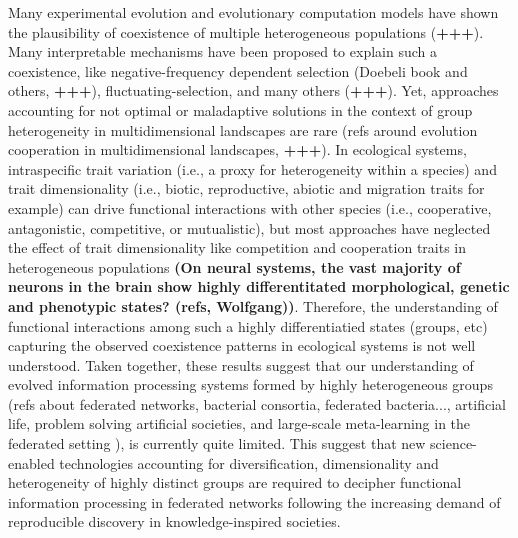 \documentclass[11pt, a4paper]{article} %
\begin{document}
Many experimental evolution and evolutionary computation models have
shown the plausibility of coexistence of multiple heterogeneous
populations ({\bf +++}). Many interpretable mechanisms have been
proposed to explain such a coexistence, like negative-frequency
dependent selection (Doebeli book and others, {\bf +++}),
fluctuating-selection, and many others ({\bf +++}). Yet, approaches
accounting for not optimal or maladaptive solutions in the context of
group heterogeneity in multidimensional landscapes are rare (refs
around evolution cooperation in multidimensional landscapes, {\bf
  +++}). In ecological systems, intraspecific trait variation (i.e., a
proxy for heterogeneity within a species) and trait dimensionality
(i.e., biotic, reproductive, abiotic and migration traits for example)
can drive functional interactions with other species (i.e.,
cooperative, antagonistic, competitive, or mutualistic), but most
approaches have neglected the effect of trait dimensionality like
competition and cooperation traits in heterogeneous populations {\bf
  (On neural systems, the vast majority of neurons in the brain show
  highly differentitated morphological, genetic and phenotypic states?
  (refs, Wolfgang))}. Therefore, the understanding of functional
interactions among such a highly differentiatied states (groups, etc)
capturing the observed coexistence patterns in ecological systems is
not well understood. Taken together, these results suggest that our
understanding of evolved information processing systems formed by
highly heterogeneous groups (refs about federated networks, bacterial
consortia, federated bacteria..., artificial life, problem solving
artificial societies, and large-scale meta-learning in the federated
setting \citep{Dilley2016}), is currently quite limited. This suggest
that new science-enabled technologies accounting for diversification,
dimensionality and heterogeneity of highly distinct groups are
required to decipher functional information processing in federated
networks following the increasing demand of reproducible discovery in
knowledge-inspired societies.
\end{document}
